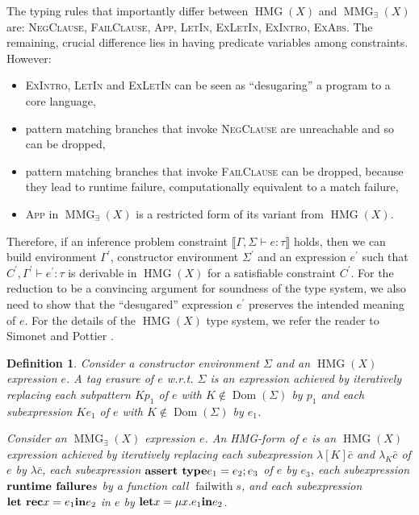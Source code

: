 \documentclass{article}
\newcommand{\nin}{\not\in}
\newcommand{\tmem}[1]{{\em #1\/}}
\newcommand{\tmname}[1]{\textsc{#1}}
\newcommand{\tmop}[1]{\ensuremath{\operatorname{#1}}}
\newcommand{\tmstrong}[1]{\textbf{#1}}
\newtheorem{definition}{Definition}
{\theorembodyfont{\rmfamily}\newtheorem{example}{Example}}
\begin{document}
The typing rules that importantly differ between $\tmop{HMG} (X)$ and
$\tmop{MMG}_{\exists} (X)$ are: {\tmname{NegClause}}, {\tmname{FailClause}},
{\tmname{App}}, {\tmname{LetIn}}, {\tmname{ExLetIn}}, {\tmname{ExIntro}},
{\tmname{ExAbs}}. The remaining, crucial difference lies in having predicate
variables among constraints. However:
\begin{itemize}
  \item {\tmname{ExIntro}}, {\tmname{LetIn}} and {\tmname{ExLetIn}} can be
  seen as ``desugaring'' a program to a core language,
  
  \item pattern matching branches that invoke {\tmname{NegClause}} are
  unreachable and so can be dropped,
  
  \item pattern matching branches that invoke {\tmname{FailClause}} can be
  dropped, because they lead to runtime failure, computationally equivalent to
  a match failure,
  
  \item {\tmname{App}} in $\tmop{MMG}_{\exists} (X)$ is a restricted form of
  its variant from $\tmop{HMG} (X)$.
\end{itemize}
Therefore, if an inference problem constraint $\llbracket \Gamma, \Sigma
\vdash e : \tau \rrbracket$ holds, then we can build environment
$\Gamma^{\prime}$, constructor environment $\Sigma^{\prime}$ and an expression
$e^{\prime}$ such that $C^{\prime}, \Gamma^{\prime} \vdash e^{\prime} : \tau$
is derivable in $\tmop{HMG} (X)$ for a satisfiable constraint $C^{\prime}$.
For the reduction to be a convincing argument for soundness of the type
system, we also need to show that the ``desugared'' expression $e^{\prime}$
preserves the intended meaning of $e$. For the details of the $\tmop{HMG} (X)$
type system, we refer the reader to Simonet and Pottier
{\cite{simonet-pottier-hmg-toplas}}.

\begin{definition}
  \label{SemNormForm}Consider a constructor environment $\Sigma$ and an
  $\tmop{HMG} (X)$ expression $e$. A {\tmem{tag erasure}} of $e$ w.r.t.
  $\Sigma$ is an expression achieved by iteratively replacing each subpattern
  $K p_1$ of $e$ with $K \nin \tmop{Dom} (\Sigma)$ by $p_1$ and each
  subexpression $K e_1$ of $e$ with $K \nin \tmop{Dom} (\Sigma)$ by $e_1$.
  
  Consider an $\tmop{MMG}_{\exists} (X)$ expression $e$. An {\tmem{HMG-form}}
  of $e$ is an $\tmop{HMG} (X)$ expression achieved by iteratively replacing
  each subexpression $\lambda [K] \bar{c}$ and $\lambda_K \bar{c}$ of $e$ by
  $\lambda \bar{c}$, each subexpression $\text{{\tmstrong{assert type}}} e_1 =
  e_2 ; e_3$ of $e$ by $e_3$, each subexpression $\text{{\tmstrong{runtime
  failure}}} s$ by a function call $\tmop{failwith} s$, and each subexpression
  $\text{{\tmstrong{let rec}}} x = e_1  \text{{\tmstrong{in}}} e_2$ in $e$ by
  $\text{{\tmstrong{let}}} x = \mu x.e_1  \text{{\tmstrong{in}}} e_2$.
\end{definition}
\end{document}
